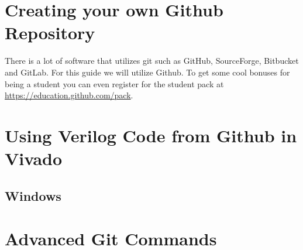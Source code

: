 \documentclass[12pt]{article}
\begin{document}
\section{Creating your own Github Repository}
There is a lot of software that utilizes git such as GitHub, SourceForge, Bitbucket and GitLab. For this guide we will utilize Github. To get some cool bonuses for being a student you can even register for the student pack at \href{https://education.github.com/pack}{https://education.github.com/pack}.





\section{Using Verilog Code from Github in Vivado}
\subsection{Windows}


\section{Advanced Git Commands}
\end{document}
